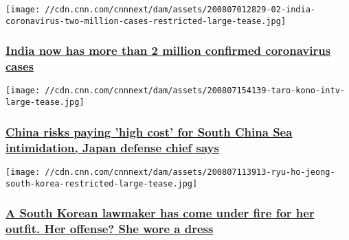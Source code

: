 \href{/2020/08/07/asia/india-coronavirus-two-million-intl-hnk/index.html}{}

\texttt{[image: //cdn.cnn.com/cnnnext/dam/assets/200807012829-02-india-coronavirus-two-million-cases-restricted-large-tease.jpg]}

\hypertarget{india-now-has-more-than-2-million-confirmed-coronavirus-cases}{%
\subsubsection{\texorpdfstring{\href{/2020/08/07/asia/india-coronavirus-two-million-intl-hnk/index.html}{India
now has more than 2 million confirmed coronavirus
cases}}{India now has more than 2 million confirmed coronavirus cases}}\label{india-now-has-more-than-2-million-confirmed-coronavirus-cases}}

\href{/2020/08/07/asia/japan-defense-minister-interview-south-china-sea-intl-hnk/index.html}{}

\texttt{[image: //cdn.cnn.com/cnnnext/dam/assets/200807154139-taro-kono-intv-large-tease.jpg]}

\hypertarget{china-risks-paying-high-cost-for-south-china-sea-intimidation-japan-defense-chief-says}{%
\subsubsection{\texorpdfstring{\href{/2020/08/07/asia/japan-defense-minister-interview-south-china-sea-intl-hnk/index.html}{China
risks paying 'high cost' for South China Sea intimidation, Japan defense
chief
says}}{China risks paying 'high cost' for South China Sea intimidation, Japan defense chief says}}\label{china-risks-paying-high-cost-for-south-china-sea-intimidation-japan-defense-chief-says}}

\href{/2020/08/07/asia/south-korea-politician-dress-intl-hnk/index.html}{}

\texttt{[image: //cdn.cnn.com/cnnnext/dam/assets/200807113913-ryu-ho-jeong-south-korea-restricted-large-tease.jpg]}

\hypertarget{a-south-korean-lawmaker-has-come-under-fire-for-her-outfit-her-offense-she-wore-a-dress}{%
\subsubsection{\texorpdfstring{\href{/2020/08/07/asia/south-korea-politician-dress-intl-hnk/index.html}{A
South Korean lawmaker has come under fire for her outfit. Her offense?
She wore a
dress}}{A South Korean lawmaker has come under fire for her outfit. Her offense? She wore a dress}}\label{a-south-korean-lawmaker-has-come-under-fire-for-her-outfit-her-offense-she-wore-a-dress}}

